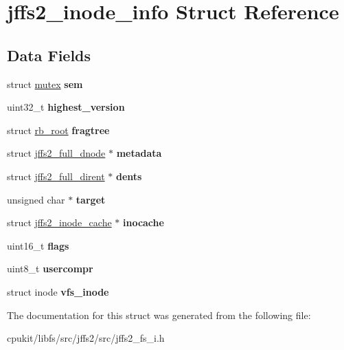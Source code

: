 \hypertarget{structjffs2__inode__info}{}\section{jffs2\+\_\+inode\+\_\+info Struct Reference}
\label{structjffs2__inode__info}
\subsection*{Data Fields}
\begin{DoxyCompactItemize}
\item 
\mbox{\label{structjffs2__inode__info_a7870075b69196a41c56f91c37a4fe6f4}} 
struct \mbox{\hyperlink{structmutex}{mutex}} {\bfseries sem}
\item 
\mbox{\label{structjffs2__inode__info_ace495d5d89f853f1373e81a7dda2a9c0}} 
uint32\+\_\+t {\bfseries highest\+\_\+version}
\item 
\mbox{\label{structjffs2__inode__info_ad378ea9297240d0ae853b054b0c7d2e7}} 
struct \mbox{\hyperlink{structrb__root}{rb\+\_\+root}} {\bfseries fragtree}
\item 
\mbox{\label{structjffs2__inode__info_ae8131afe17b41f03164158b2d1672ad7}} 
struct \mbox{\hyperlink{structjffs2__full__dnode}{jffs2\+\_\+full\+\_\+dnode}} $\ast$ {\bfseries metadata}
\item 
\mbox{\label{structjffs2__inode__info_a5f5bf872f7ad8564ce316ffc66e4626b}} 
struct \mbox{\hyperlink{structjffs2__full__dirent}{jffs2\+\_\+full\+\_\+dirent}} $\ast$ {\bfseries dents}
\item 
\mbox{\label{structjffs2__inode__info_a31c10176ad2feeedb49df66f994b8504}} 
unsigned char $\ast$ {\bfseries target}
\item 
\mbox{\label{structjffs2__inode__info_a47eb35059687b7a105abdc9f45100234}} 
struct \mbox{\hyperlink{structjffs2__inode__cache}{jffs2\+\_\+inode\+\_\+cache}} $\ast$ {\bfseries inocache}
\item 
\mbox{\label{structjffs2__inode__info_a05d2ea59d502dc233c1a208e6c46480e}} 
uint16\+\_\+t {\bfseries flags}
\item 
\mbox{\label{structjffs2__inode__info_ace219b6519cb7df15f3381edfe42a2d8}} 
uint8\+\_\+t {\bfseries usercompr}
\item 
\mbox{\label{structjffs2__inode__info_adac75cb51e70d9c78e3e4b2bd7f5eefd}} 
struct inode {\bfseries vfs\+\_\+inode}
\end{DoxyCompactItemize}


The documentation for this struct was generated from the following file\+:\begin{DoxyCompactItemize}
\item 
cpukit/libfs/src/jffs2/src/jffs2\+\_\+fs\+\_\+i.\+h\end{DoxyCompactItemize}
